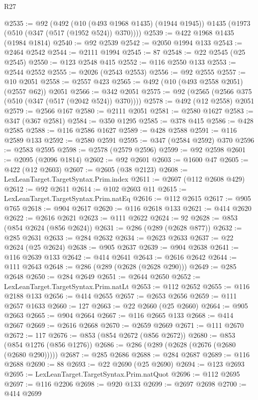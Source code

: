 \begin{lexlean}{R27}
\begin{coremodule}
@2535 := @92
    (@492
      (@10 (@493 @1968 @1435) (@1944 @1945))
      @1435
      (@1973 (@510 (@347 (@517 (@1952 @524)) @370))))
@2539 := @422 @1968 @1435 (@1984 @1814)
@2540 := @92 @2539
@2542 := @2050 @1994 @133
@2543 := @2464 @2542
@2544 := @2111 @1994
@2545 := 87
@2548 := @22 @2545 (@25 @2545)
@2550 := @123 @2548 @415
@2552 := @116 @2550 @133
@2553 := @2544 @2552
@2555 := @2026 (@2543 @2553)
@2556 := @92 @2555
@2557 := @10 @2051
@2558 := @2557 @423
@2565 := @492 (@10 (@493 @2558 @2051) (@2557 @62)) @2051
@2566 := @342 @2051
@2575 := @92 (@2565 (@2566 @375 (@510 (@347 (@517 (@2042 @524)) @370))))
@2578 := @492 (@12 @2558) @2051
@2579 := @2566 @167
@2580 := @2111 @2051
@2581 := @2580 @1627
@2583 := @347 (@367 @2581)
@2584 := @350 @1295
@2585 := @378 @415
@2586 := @428 @2585
@2588 := @116 @2586 @1627
@2589 := @428 @2588
@2591 := @116 @2589 @133
@2592 := @2580 @2591
@2595 := @347 (@2584 @2592) @370
@2596 := @2583 @2595
@2598 := @2578 (@2579 @2596)
@2599 := @92 @2598
@2601 := @2095 (@2096 @1814)
@2602 := @92 @2601
@2603 := @1600 @47
@2605 := @422 (@12 @2603)
@2607 := @2605 (@38 @2123)
@2608 := LexLeanTarget.TargetSyntax.Prim.index
@2611 := @2607 (@112 @2608 @429)
@2612 := @92 @2611
@2614 := @102 @2603 @11
@2615 := LexLeanTarget.TargetSyntax.Prim.natEq
@2616 := @112 @2615
@2617 := @905 @765
@2618 := @904 @2617
@2620 := @116 @2618 @133
@2621 := @414 @2620
@2622 := @2616 @2621
@2623 := @111 @2622
@2624 := 92
@2628 := @853 (@854 @2624 (@856 @2624))
@2631 := @286 (@289 (@2628 @877))
@2632 := @285 @2631
@2633 := @284 @2632
@2634 := @2623 @2633
@2637 := @22 @2624 (@25 @2624)
@2638 := @905 @2637
@2639 := @904 @2638
@2641 := @116 @2639 @133
@2642 := @414 @2641
@2643 := @2616 @2642
@2644 := @111 @2643
@2648 := @286 (@289 (@2628 (@2628 @290)))
@2649 := @285 @2648
@2650 := @284 @2649
@2651 := @2644 @2650
@2652 := LexLeanTarget.TargetSyntax.Prim.natLt
@2653 := @112 @2652
@2655 := @116 @2188 @133
@2656 := @414 @2655
@2657 := @2653 @2656
@2659 := @111 @2657 @1633
@2660 := 127
@2663 := @22 @2660 (@25 @2660)
@2664 := @905 @2663
@2665 := @904 @2664
@2667 := @116 @2665 @133
@2668 := @414 @2667
@2669 := @2616 @2668
@2670 := @2659 @2669
@2671 := @111 @2670
@2672 := 117
@2676 := @853 (@854 @2672 (@856 @2672))
@2680 := @853 (@854 @1276 (@856 @1276))
@2686 := @286 (@289 (@2628 (@2676 (@2680 (@2680 @290)))))
@2687 := @285 @2686
@2688 := @284 @2687
@2689 := @116 @2688
@2690 := 88
@2693 := @22 @2690 (@25 @2690)
@2694 := @123 @2693
@2695 := LexLeanTarget.TargetSyntax.Prim.natQuot
@2696 := @112 @2695
@2697 := @116 @2206
@2698 := @920 @133
@2699 := @2697 @2698
@2700 := @414 @2699

\end{coremodule}
\end{lexlean}
